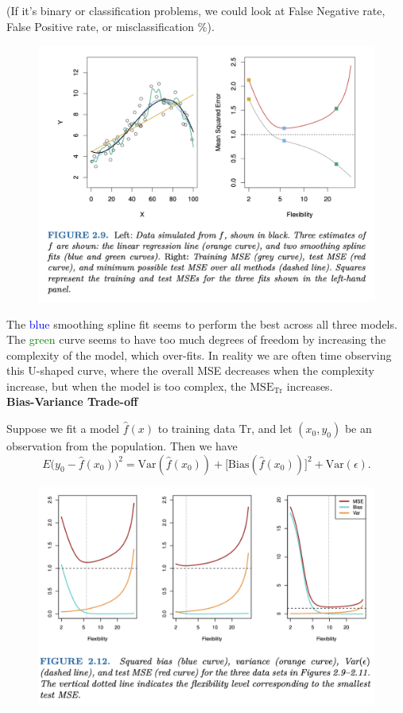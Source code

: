 \documentclass{article}
\begin{document}
(If it's binary or classification problems, we could look at False Negative rate, False Positive rate, or misclassification \%).
\newpage
\begin{figure}[h!]
    \centering
    \includegraphics[width=0.75\linewidth]{Training_vs._Testing.png}
    \label{fig:train-vs-test}
\end{figure}

The \textcolor{blue}{blue} smoothing spline fit seems to perform the best across all three models. The \textcolor{green}{green} curve seems to have too much degrees of freedom by increasing the complexity of the model, which over-fits. In reality we are often time observing this U-shaped curve, where the overall MSE decreases when the complexity increase, but when the model is too complex, the $\mathrm{MSE_{Tr}}$ increases.\\

\noindent \textbf{Bias-Variance Trade-off}

Suppose we fit a model $\hat{f}(x)$ to training data $\mathrm{Tr}$, and let $(x_0, y_0)$ be an observation from the population. Then we have $$E\Big(y_0 - \hat{f}(x_0)\Big)^2 = \mathrm{Var}(\hat{f}(x_0)) + \Big[\mathrm{Bias}(\hat{f}(x_0))\Big]^2 + \mathrm{Var}(\epsilon).$$

\begin{figure}[h!]
    \centering
    \includegraphics[width=0.75\linewidth]{bias_variance_tradeoff.png}
    \label{Bias-variance-tradeoff}
\end{figure}
\end{document}
